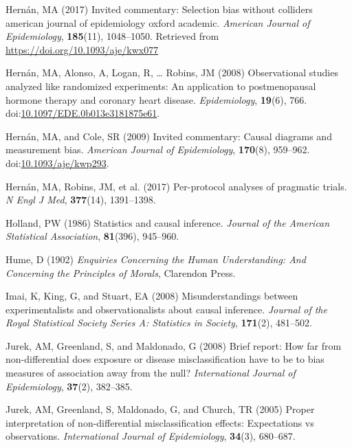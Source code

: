 \documentclass[
  single column]{article}
\newlength{\cslhangindent}
\newenvironment{CSLReferences}[2] %
 {\begin{list}{}{%
  \setlength{\itemindent}{0pt}
  \setlength{\leftmargin}{0pt}
  \setlength{\parsep}{0pt}
  \ifodd #1
   \setlength{\leftmargin}{\cslhangindent}
   \setlength{\itemindent}{-1\cslhangindent}
  \fi
  \setlength{\itemsep}{#2\baselineskip}}}
 {\end{list}}
\begin{document}
\begin{CSLReferences}{1}{0}
Hernán, MA (2017) Invited commentary: Selection bias without colliders
\textbar{} american journal of epidemiology \textbar{} oxford academic.
\emph{American Journal of Epidemiology}, \textbf{185}(11), 1048--1050.
Retrieved from \url{https://doi.org/10.1093/aje/kwx077}

Hernán, MA, Alonso, A, Logan, R, \ldots{} Robins, JM (2008)
Observational studies analyzed like randomized experiments: An
application to postmenopausal hormone therapy and coronary heart
disease. \emph{Epidemiology}, \textbf{19}(6), 766.
doi:\href{https://doi.org/10.1097/EDE.0b013e3181875e61}{10.1097/EDE.0b013e3181875e61}.

Hernán, MA, and Cole, SR (2009) Invited commentary: Causal diagrams and
measurement bias. \emph{American Journal of Epidemiology},
\textbf{170}(8), 959--962.
doi:\href{https://doi.org/10.1093/aje/kwp293}{10.1093/aje/kwp293}.

Hernán, MA, Robins, JM, et al. (2017) Per-protocol analyses of pragmatic
trials. \emph{N Engl J Med}, \textbf{377}(14), 1391--1398.

Holland, PW (1986) Statistics and causal inference. \emph{Journal of the
American Statistical Association}, \textbf{81}(396), 945--960.

Hume, D (1902) \emph{Enquiries Concerning the Human Understanding: And
Concerning the Principles of Morals}, Clarendon Press.

Imai, K, King, G, and Stuart, EA (2008) Misunderstandings between
experimentalists and observationalists about causal inference.
\emph{Journal of the Royal Statistical Society Series A: Statistics in
Society}, \textbf{171}(2), 481--502.

Jurek, AM, Greenland, S, and Maldonado, G (2008) Brief report: How far
from non-differential does exposure or disease misclassification have to
be to bias measures of association away from the null?
\emph{International Journal of Epidemiology}, \textbf{37}(2), 382--385.

Jurek, AM, Greenland, S, Maldonado, G, and Church, TR (2005) Proper
interpretation of non-differential misclassification effects:
Expectations vs observations. \emph{International Journal of
Epidemiology}, \textbf{34}(3), 680--687.


\end{CSLReferences}
\end{document}

